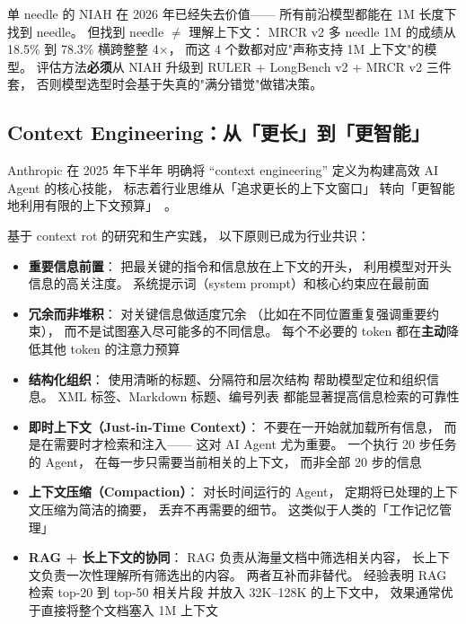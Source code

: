 \begin{warnbox}
单 needle 的 NIAH 在 2026 年已经失去价值——
所有前沿模型都能在 1M 长度下找到 needle。
但找到 needle $\neq$ 理解上下文：
MRCR v2 多 needle 1M 的成绩从 18.5\% 到 78.3\%
横跨整整 4$\times$，
而这 4 个数都对应"声称支持 1M 上下文"的模型。
评估方法\textbf{必须}从 NIAH 升级到
RULER + LongBench v2 + MRCR v2 三件套，
否则模型选型时会基于失真的"满分错觉"做错决策。
\end{warnbox}

\subsection{Context Engineering：从「更长」到「更智能」}

Anthropic 在 2025 年下半年
明确将 “context engineering” 定义为构建高效 AI Agent 的核心技能，
标志着行业思维从「追求更长的上下文窗口」
转向「更智能地利用有限的上下文预算」~\cite{anthropic2025contexteng}。

\begin{whybox}
基于 context rot 的研究和生产实践，
以下原则已成为行业共识：
\begin{itemize}[noitemsep]
  \item \textbf{重要信息前置}：
        把最关键的指令和信息放在上下文的开头，
        利用模型对开头信息的高关注度。
        系统提示词（system prompt）和核心约束应在最前面
  \item \textbf{冗余而非堆积}：
        对关键信息做适度冗余
       （比如在不同位置重复强调重要约束），
        而不是试图塞入尽可能多的不同信息。
        每个不必要的 token 都在\textbf{主动}降低其他 token 的注意力预算
  \item \textbf{结构化组织}：
        使用清晰的标题、分隔符和层次结构
        帮助模型定位和组织信息。
        XML 标签、Markdown 标题、编号列表
        都能显著提高信息检索的可靠性
  \item \textbf{即时上下文（Just-in-Time Context）}：
        不要在一开始就加载所有信息，
        而是在需要时才检索和注入——
        这对 AI Agent 尤为重要。
        一个执行 20 步任务的 Agent，
        在每一步只需要当前相关的上下文，
        而非全部 20 步的信息
  \item \textbf{上下文压缩（Compaction）}：
        对长时间运行的 Agent，
        定期将已处理的上下文压缩为简洁的摘要，
        丢弃不再需要的细节。
        这类似于人类的「工作记忆管理」
  \item \textbf{RAG + 长上下文的协同}：
        RAG 负责从海量文档中筛选相关内容，
        长上下文负责一次性理解所有筛选出的内容。
        两者互补而非替代。
        经验表明 RAG 检索 top-20 到 top-50 相关片段
        并放入 32K--128K 的上下文中，
        效果通常优于直接将整个文档塞入 1M 上下文
\end{itemize}
\end{whybox}

